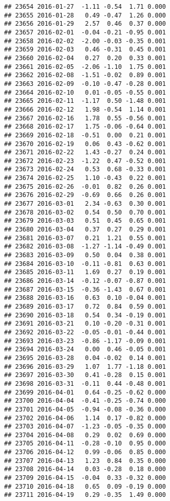 \documentclass[
]{article}
\begin{document}
\begin{verbatim}
## 23654 2016-01-27  -1.11 -0.54  1.71 0.000
## 23655 2016-01-28   0.49 -0.47  1.26 0.000
## 23656 2016-01-29   2.57  0.46  0.37 0.000
## 23657 2016-02-01  -0.04 -0.21 -0.95 0.001
## 23658 2016-02-02  -2.00 -0.03 -0.35 0.001
## 23659 2016-02-03   0.46 -0.31  0.45 0.001
## 23660 2016-02-04   0.27  0.20  0.33 0.001
## 23661 2016-02-05  -2.06 -1.10  1.75 0.001
## 23662 2016-02-08  -1.51 -0.02  0.89 0.001
## 23663 2016-02-09  -0.10 -0.47 -0.28 0.001
## 23664 2016-02-10   0.01 -0.05 -0.55 0.001
## 23665 2016-02-11  -1.17  0.50 -1.48 0.001
## 23666 2016-02-12   1.98 -0.54  1.14 0.001
## 23667 2016-02-16   1.78  0.55 -0.56 0.001
## 23668 2016-02-17   1.75 -0.06 -0.64 0.001
## 23669 2016-02-18  -0.51  0.00  0.21 0.001
## 23670 2016-02-19   0.06  0.43 -0.62 0.001
## 23671 2016-02-22   1.43 -0.27  0.24 0.001
## 23672 2016-02-23  -1.22  0.47 -0.52 0.001
## 23673 2016-02-24   0.53  0.68 -0.33 0.001
## 23674 2016-02-25   1.10 -0.43  0.22 0.001
## 23675 2016-02-26  -0.01  0.82  0.26 0.001
## 23676 2016-02-29  -0.69  0.66  0.26 0.001
## 23677 2016-03-01   2.34 -0.63  0.30 0.001
## 23678 2016-03-02   0.54  0.50  0.70 0.001
## 23679 2016-03-03   0.51  0.45  0.65 0.001
## 23680 2016-03-04   0.37  0.27  0.29 0.001
## 23681 2016-03-07   0.21  1.21  0.55 0.001
## 23682 2016-03-08  -1.27 -1.14 -0.49 0.001
## 23683 2016-03-09   0.50  0.04  0.38 0.001
## 23684 2016-03-10  -0.11 -0.81  0.63 0.001
## 23685 2016-03-11   1.69  0.27  0.19 0.001
## 23686 2016-03-14  -0.12 -0.07 -0.87 0.001
## 23687 2016-03-15  -0.36 -1.43  0.67 0.001
## 23688 2016-03-16   0.63  0.10 -0.04 0.001
## 23689 2016-03-17   0.72  0.84  0.59 0.001
## 23690 2016-03-18   0.54  0.34 -0.19 0.001
## 23691 2016-03-21   0.10 -0.20 -0.31 0.001
## 23692 2016-03-22  -0.05 -0.01 -0.44 0.001
## 23693 2016-03-23  -0.86 -1.17 -0.09 0.001
## 23694 2016-03-24   0.00  0.46 -0.05 0.001
## 23695 2016-03-28   0.04 -0.02  0.14 0.001
## 23696 2016-03-29   1.07  1.77 -1.18 0.001
## 23697 2016-03-30   0.41 -0.28  0.15 0.001
## 23698 2016-03-31  -0.11  0.44 -0.48 0.001
## 23699 2016-04-01   0.64 -0.25 -0.62 0.000
## 23700 2016-04-04  -0.41 -0.25 -0.74 0.000
## 23701 2016-04-05  -0.94 -0.08 -0.36 0.000
## 23702 2016-04-06   1.14  0.17 -0.82 0.000
## 23703 2016-04-07  -1.23 -0.05 -0.35 0.000
## 23704 2016-04-08   0.29  0.02  0.69 0.000
## 23705 2016-04-11  -0.28 -0.10  0.95 0.000
## 23706 2016-04-12   0.99 -0.06  0.85 0.000
## 23707 2016-04-13   1.23  0.84  0.35 0.000
## 23708 2016-04-14   0.03 -0.28  0.18 0.000
## 23709 2016-04-15  -0.04  0.33 -0.32 0.000
## 23710 2016-04-18   0.65  0.09 -0.19 0.000
## 23711 2016-04-19   0.29 -0.35  1.49 0.000

\end{verbatim}
\end{document}
